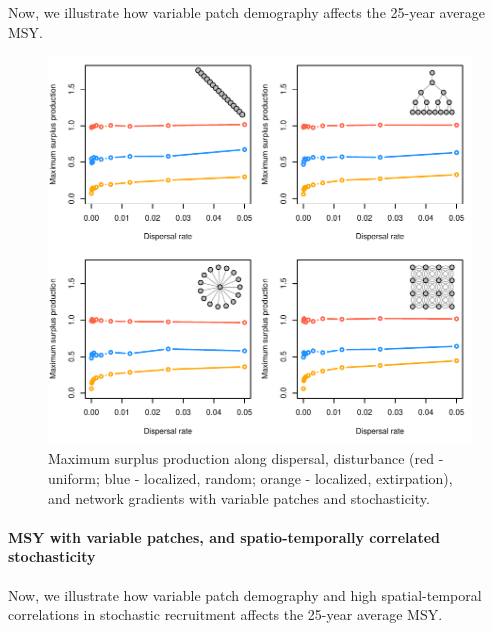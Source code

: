 \documentclass[
]{article}
\begin{document}
Now, we illustrate how variable patch demography affects the 25-year
average MSY.

\begin{figure}[H]

{\centering \includegraphics{Managing_for_ecological_surprises_in_metapopulations_files/figure-latex/MSY with variable patches and stochasticity-1} 

}

\caption{Maximum surplus production along dispersal, disturbance (red - uniform; blue - localized, random; orange - localized, extirpation), and network gradients with variable patches and stochasticity.}\label{fig:MSY with variable patches and stochasticity}
\end{figure}
\newpage

\hypertarget{msy-with-variable-patches-and-spatio-temporally-correlated-stochasticity}{%
\paragraph{MSY with variable patches, and spatio-temporally correlated
stochasticity}\label{msy-with-variable-patches-and-spatio-temporally-correlated-stochasticity}}

Now, we illustrate how variable patch demography and high
spatial-temporal correlations in stochastic recruitment affects the
25-year average MSY.
\end{document}
